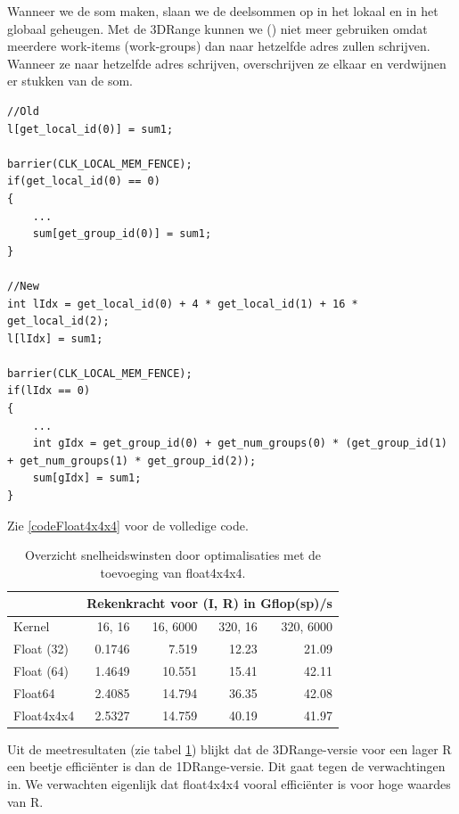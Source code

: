 Wanneer we de som maken, slaan we de deelsommen op in het lokaal en in het globaal geheugen. Met de 3DRange kunnen we () niet meer gebruiken omdat meerdere work-items (work-groups) dan naar hetzelfde adres zullen schrijven. Wanneer ze naar hetzelfde adres schrijven, overschrijven ze elkaar en verdwijnen er stukken van de som.
\begin{lstlisting}
//Old
l[get_local_id(0)] = sum1;
	
barrier(CLK_LOCAL_MEM_FENCE);
if(get_local_id(0) == 0)
{        
	...
	sum[get_group_id(0)] = sum1;
}

//New
int lIdx = get_local_id(0) + 4 * get_local_id(1) + 16 * get_local_id(2);
l[lIdx] = sum1;

barrier(CLK_LOCAL_MEM_FENCE);
if(lIdx == 0)
{        
	...
	int gIdx = get_group_id(0) + get_num_groups(0) * (get_group_id(1) + get_num_groups(1) * get_group_id(2));
	sum[gIdx] = sum1;
}
\end{lstlisting}


Zie \ref{codeFloat4x4x4} voor de volledige code.



\begin{table}
	\centering
    \begin{tabular}{|l| r|r| r |r|}
		\hline
						& \multicolumn{4}{c|}{Rekenkracht voor (I, R) in Gflop(sp)/s}\\
		\hline
		Kernel          & 16, 16 	& 16, 6000	& 320, 16	&  320, 6000 \\
		\hline
		Float (32)      & 0.1746  	& 7.519   	& 12.23 	& 21.09 	\\
		Float (64)      & 1.4649	& 10.551  	& 15.41  	& 42.11  	\\
		Float64         & 2.4085 	& 14.794  	& 36.35 	& 42.08 	\\
		Float4x4x4      & 2.5327  	& 14.759 	& 40.19 	& 41.97  	\\
		\hline
    \end{tabular}
    \caption{\label{measF4} Overzicht snelheidswinsten door optimalisaties met de toevoeging van float4x4x4.}
\end{table}

Uit de meetresultaten (zie tabel \ref{measF4}) blijkt dat de 3DRange-versie voor een lager R een beetje effici\"enter is dan de 1DRange-versie. Dit gaat tegen de verwachtingen in. We verwachten eigenlijk dat float4x4x4 vooral effici\"enter is voor hoge waardes van R.

